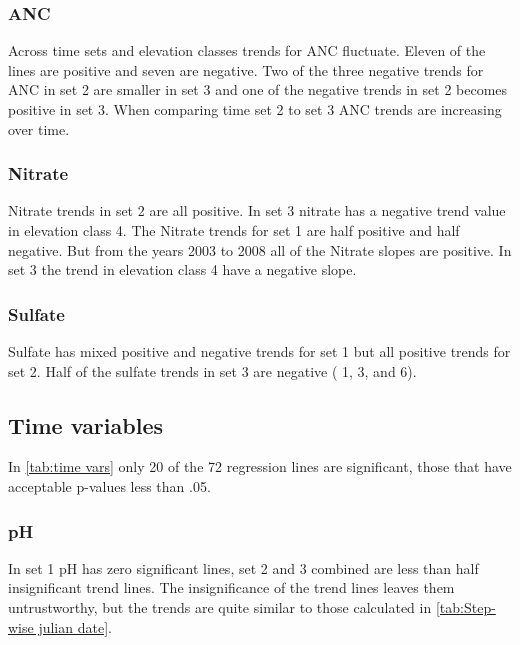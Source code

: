 \subsubsection{ANC}%

Across time sets and elevation classes trends for ANC fluctuate.  Eleven of the lines are positive and seven are negative.   Two of the three negative trends for ANC in set 2 are smaller in set 3 and one of the negative trends in set 2 becomes positive in set 3.  When comparing time set 2 to set 3 ANC trends are increasing over time. 

\subsubsection{Nitrate}%

Nitrate trends in set 2 are all positive.  In set 3 nitrate has a negative trend value in elevation class 4.  The Nitrate trends for set 1 are half positive and half negative.  But from the years 2003 to 2008 all of the Nitrate slopes are positive.  In set 3 the trend in elevation class 4  have a negative slope. 

\subsubsection{Sulfate}%

 Sulfate has mixed positive and negative trends for set 1 but all positive trends for set 2.   Half of the sulfate trends in set 3 are negative ( 1, 3, and 6).

\subsection{Time variables}

In \autoref{tab:time vars} only 20 of the 72 regression lines are significant, those that have acceptable p-values less than .05. 

\subsubsection{pH}

In set 1 pH has zero significant lines, set 2 and 3 combined are less than half insignificant trend lines.  The insignificance of the trend lines leaves them untrustworthy, but the trends are quite similar to those calculated in \autoref{tab:Step-wise julian date}.

